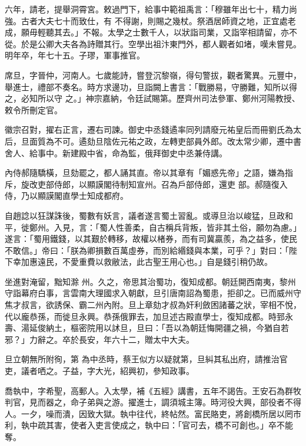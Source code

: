 \begin{pinyinscope}
 六年，請老，提舉洞霄宮。敕過門下，給事中範祖禹言：「穆雖年出七十，精力尚強。古者大夫七十而致仕，有
 不得謝，則賜之幾杖。祭酒居師資之地，正宜處老成，願毋輕聽其去。」不報。太學之士數千人，以狀詣司業，又詣宰相請留，亦不從。於是公卿大夫各為詩贈其行。空學出祖汴東門外，都人觀者如堵，嘆未嘗見。明年卒，年七十五。子璆，軍事推官。



 席旦，字晉仲，河南人。七歲能詩，嘗登沉黎嶺，得句警拔，觀者驚異。元豐中，舉進士，禮部不奏名。時方求邊功，旦詣闕上書言：「戰勝易，守勝難，知所以得之，必知所以守
 之。」神宗嘉納，令廷試賜第。歷齊州司法參軍、鄭州河陽教授、敕令所刪定官。



 徽宗召對，擢右正言，遷右司諫。御史中丞錢遹率同列請廢元祐皇后而冊劉氏為太后，旦面質為不可。遹劾旦陰佐元祐之政，左轉吏部員外郎。改太常少卿，遷中書舍人、給事中。新建殿中省，命為監，俄拜御史中丞兼侍講。



 內侍郝隨驕橫，旦劾罷之，都人誦其直。帝以其章有「媚惑先帝」之語，嫌為指斥，旋改吏部侍郎，以顯謨閣待制知宣州。召為戶部侍郎，還吏
 部。郝隨復入侍，乃以顯謨閣直學士知成都府。



 自趙諗以狂謀誅後，蜀數有妖言，議者遂言蜀土習亂。或導旦治以峻猛，旦政和平，徙鄭州。入見，言：「蜀人性善柔，自古稱兵背叛，皆非其土俗，願勿為慮。」遂言：「蜀用鐵錢，以其艱於轉移，故權以楮券，而有司冀贏羨，為之益多，使民不敢信。」帝曰：「朕為卿損數百萬虛券，而別給緡錢與本業，可乎？」對曰：「陛下幸加惠遠民，不愛重費以救敝法，此古聖王用心也。」自是錢引稍仍故。



 坐進對淹留，黜知滁
 州。久之，帝思其治蜀功，復知成都。朝廷開西南夷，黎州守詣幕府白事，言雲南大理國求入朝獻，旦引唐南詔為蜀患，拒卻之。已而威州守焦才叔言，欲誘保、霸二州內附。旦上章劾才叔為奸利斂困諸蕃之狀，宰相不悅，代以龐恭孫，而徙旦永興。恭孫俄罪去，加旦述古殿直學士，復知成都。時郅永壽、湯延俊納土，樞密院用以訹旦，旦曰：「吾以為朝廷悔開疆之禍，今猶自若邪？」力辭之。卒於長安，年六十二，贈太中大夫。



 旦立朝無所附徇，第
 為中丞時，蔡王似方以疑就第，旦糾其私出府，請推治官吏，議者哂之。子益，字大光，紹興初，參知政事。



 喬執中，字希聖，高郵人。入太學，補《五經》講書，五年不謁告。王安石為群牧判官，見而器之，命子弟與之游。擢進士，調須城主簿。時河役大興，部役者不得人。一夕，噪而潰，因致大獄。執中往代，終帖然。富民賂吏，將創橋所居以罔市利，執中疏其害，使者入吏言使成之，執中曰：「官可去，橋不可創也。」卒不能奪。




\end{pinyinscope}
